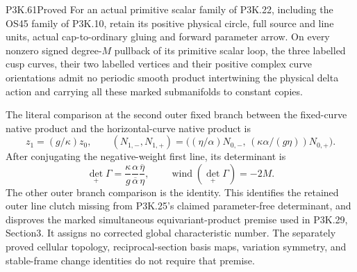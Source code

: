 \begin{statement}{P3K.61}{Proved}
For an actual primitive scalar family of P3K.22, including
the OS45 family of P3K.10, retain its positive physical circle, full
source and line units, actual cap-to-ordinary gluing and forward
parameter arrow. On every nonzero signed degree-\(M\) pullback of
its primitive scalar loop, the three labelled cusp curves, their two
labelled vertices and their positive complex curve orientations admit
no periodic smooth product intertwining the physical delta action and
carrying all these marked submanifolds to constant copies.

The literal comparison at the second outer fixed branch between the
fixed-curve native product and the horizontal-curve native product is
\[
 z_1=(g/\kappa)z_0,\qquad
 (N_{1,-},N_{1,+})=
 \bigl((\eta/\alpha)N_{0,-},\,
       (\kappa\alpha/(g\eta))N_{0,+}\bigr).
\]
After conjugating the negative-weight first line, its determinant is
\[
 \det_+\Gamma
 =\frac\kappa g\frac\alpha{\overline\alpha}
                 \frac{\overline\eta}{\eta},
 \qquad\operatorname{wind}(\det_+\Gamma)=-2M.
\]
The other outer branch comparison is the identity. This identifies
the retained outer line clutch missing from P3K.25's claimed
parameter-free determinant, and disproves the marked simultaneous
equivariant-product premise used in P3K.29, Section3. It assigns no
corrected global characteristic number. The separately proved
cellular topology, reciprocal-section basis maps, variation symmetry,
and stable-frame change identities do not require that premise.
\end{statement}

